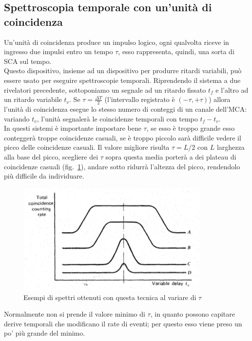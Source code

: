 \subsection{Spettroscopia temporale con un'unit\`a di coincidenza}
Un'unit\`a di coincidenza produce un impulso logico, ogni qualvolta riceve in ingresso due impulsi entro un tempo $\tau$, esso rappresenta, quindi, una sorta di SCA sul tempo.\\
Questo dispositivo, insieme ad un dispositivo per produrre ritardi variabili, pu\`o essere usato per eseguire spettroscopie temporali.
Riprendendo il sistema a due rivelatori precedente, sottoponiamo un segnale ad un ritardo fissato $t_f$ e l'altro ad un ritardo variabile $t_v$.
Se $\tau = \frac {\Delta T} { 2}$ (l'intervallo registrato \`e $(-\tau , +\tau)$) allora l'unit\`a di coincidenza esegue lo stesso numero di conteggi di un canale dell'MCA:
variando $t_v$, l'unit\`a segnaler\`a le coincidenze temporali con tempo $t_f - t_v$.\\
In questi sistemi \`e importante impostare bene $\tau$, se esso \`e troppo grande esso contegger\`a troppe coincidenze casuali, se \`e troppo piccolo sar\`a difficile vedere
il picco delle coincidenze casuali. 
Il valore migliore risulta $\tau = L/2$ con $L$ larghezza alla base del picco, scegliere dei $\tau$ sopra questa media porter\`a a dei plateau di coincidenze casuali (fig.~\ref{fig:plateau}),
andare sotto ridurr\`a l'altezza del picco, rendendolo pi\`u difficile da individuare.
\begin{figure}[htbp]
\begin{center}
\includegraphics[scale=1]{./Immagini/Plateau.png}
\caption{Esempi di spettri ottenuti con questa tecnica al variare di $\tau$}
\label{fig:plateau}
\end{center}
\end{figure}
Normalmente non si prende il valore minimo di $\tau$, in quanto possono capitare derive temporali che modificano il rate di eventi;
per questo esso viene preso un po' pi\`u grande del minimo.
